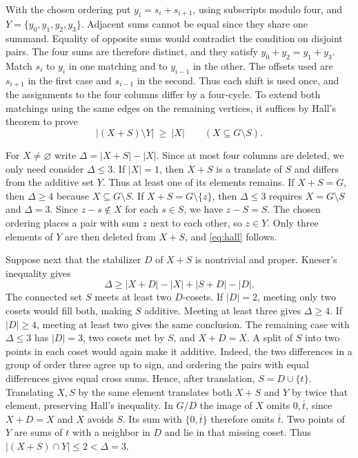 \documentclass[11pt,reqno]{amsart}
\theoremstyle{remark}
\numberwithin{equation}{section}
\begin{document}
With the chosen ordering put \(y_i=s_i+s_{i+1}\), using subscripts modulo
four, and \(Y=\{y_0,y_1,y_2,y_3\}\). Adjacent sums cannot be equal since
they share one summand. Equality of opposite sums would contradict the
condition on disjoint pairs. The four sums are therefore distinct, and
they satisfy \(y_0+y_2=y_1+y_3\). Match \(s_i\) to \(y_i\) in one
matching and to \(y_{i-1}\) in the other. The offsets used are
\(s_{i+1}\) in the first case and \(s_{i-1}\) in the second. Thus each
shift is used once, and the assignments to the four columns differ by a
four-cycle. To extend both matchings using the same edges on the
remaining vertices, it suffices by Hall's theorem to prove
\begin{equation}\label{eq:hall}
 |(X+S)\setminus Y|\ \geq\ |X|\qquad(X\subseteq G\setminus S).
\end{equation}

For \(X\ne\varnothing\) write \(\Delta=|X+S|-|X|\). Since at most four
columns are deleted, we only need consider \(\Delta\leq3\). If \(|X|=1\),
then \(X+S\) is a translate of \(S\) and differs from the additive set
\(Y\). Thus at least one of its elements remains. If \(X+S=G\), then
\(\Delta\ge4\) because \(X\subseteq G\setminus S\). If
\(X+S=G\setminus\{z\}\), then \(\Delta\le3\) requires \(X=G\setminus S\)
and \(\Delta=3\). Since \(z-s\notin X\) for each \(s\in S\), we have
\(z-S=S\). The chosen ordering places a pair with sum \(z\) next to each
other, so \(z\in Y\). Only three elements of \(Y\) are then deleted from
\(X+S\), and \eqref{eq:hall} follows.

Suppose next that the stabilizer \(D\) of \(X+S\) is nontrivial and
proper. Kneser's inequality \cite{Kemperman,Lev} gives
\[
 \Delta\geq |X+D|-|X|+|S+D|-|D|.
\]
The connected set \(S\) meets at least two \(D\)-cosets. If \(|D|=2\),
meeting only two cosets would fill both, making \(S\) additive. Meeting
at least three gives \(\Delta\ge4\). If \(|D|\ge4\), meeting at least two
gives the same conclusion. The remaining case with \(\Delta\le3\) has
\(|D|=3\), two cosets met by \(S\), and \(X+D=X\). A split of \(S\) into
two points in each coset would again make it additive. Indeed, the two
differences in a group of order three agree up to sign, and ordering the
pairs with equal differences gives equal cross sums. Hence, after
translation, \(S=D\cup\{t\}\). Translating \(X,S\) by the same element
translates both \(X+S\) and \(Y\) by twice that element, preserving
Hall's inequality. In \(G/D\) the image of \(X\) omits \(0,\bar t\),
since \(X+D=X\) and \(X\) avoids \(S\). Its sum with \(\{0,\bar t\}\)
therefore omits \(\bar t\). Two points of \(Y\) are sums of \(t\) with a
neighbor in \(D\) and lie in that missing coset. Thus \(|(X+S)\cap
Y|\le2<\Delta=3\).
\end{document}
